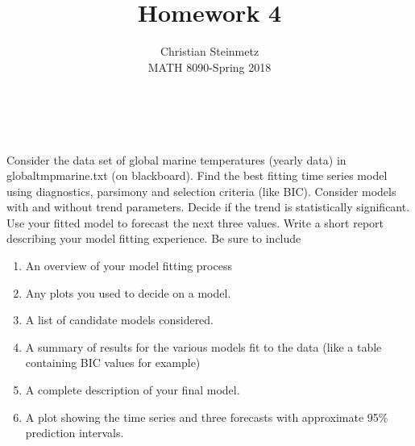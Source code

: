 \documentclass[12pt]{article}
\newenvironment{problem}[2][Problem]{\begin{trivlist}
	\item[\hskip \labelsep {\bfseries #1}\hskip \labelsep {\bfseries #2.}]}{\end{trivlist}}
\begin{document}
	 
	 
	\title{Homework 4}%
	\author{Christian Steinmetz\\ %
	MATH 8090-Spring 2018} %
	 
	\maketitle
	
	\begin{problem}{6}
	$ $ \\
	$ $ \\
	Consider the data set of global marine temperatures (yearly data) in globaltmpmarine.txt (on blackboard). Find the best fitting time series model using diagnostics, parsimony and selection criteria (like BIC).  Consider models with and without trend parameters.  Decide if the trend is statistically significant. Use your fitted model to forecast the next three values. Write a short report describing your model fitting experience. Be sure to include
	\begin{enumerate}[label=(\alph*)]
		\item An overview of your model fitting process
		\item Any plots you used to decide on a model.
		\item A list of candidate models considered.
		\item A summary of results for the various models fit to the data (like a table containing BIC values for example)
		\item A complete description of your final model.
		\item A plot showing the time series and three forecasts with approximate 95\% prediction intervals.
	\end{enumerate}
	
	\end{problem}
	
\end{document}
